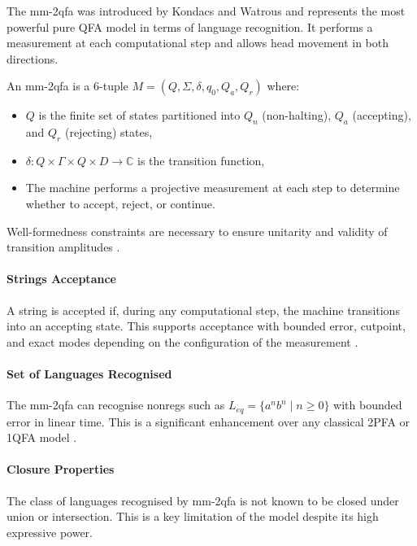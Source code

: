 \subsubsection{}

The \gls{mm-2qfa} was introduced by Kondacs and Watrous \cite{kondacs1997power} and represents the most powerful pure QFA model in terms of language recognition. It performs a measurement at each computational step and allows head movement in both directions.

\begin{definition}
An \gls{mm-2qfa} is a 6-tuple $M = (Q, \Sigma, \delta, q_0, Q_a, Q_r)$ where:
\begin{itemize}
    \item $Q$ is the finite set of states partitioned into $Q_n$ (non-halting), $Q_a$ (accepting), and $Q_r$ (rejecting) states,
    \item $\delta: Q \times \Gamma \times Q \times D \to \mathbb{C}$ is the transition function,
    \item The machine performs a projective measurement at each step to determine whether to accept, reject, or continue.
\end{itemize}
\end{definition}
Well-formedness constraints are necessary to ensure unitarity and validity of transition amplitudes \cite{kondacs1997power}.

\paragraph{Strings Acceptance} A string is accepted if, during any computational step, the machine transitions into an accepting state. This supports acceptance with bounded error, cutpoint, and exact modes depending on the configuration of the measurement \cite{kondacs1997power}.

\paragraph{Set of Languages Recognised} The \gls{mm-2qfa} can recognise non\glspl{reg} such as $L_{eq} = \{ a^n b^n \mid n \geq 0 \}$ with bounded error in linear time. This is a significant enhancement over any classical 2PFA or 1QFA model \cite{kondacs1997power}.

\paragraph{Closure Properties} The class of languages recognised by \gls{mm-2qfa} is not known to be closed under union or intersection. This is a key limitation of the model despite its high expressive power.

